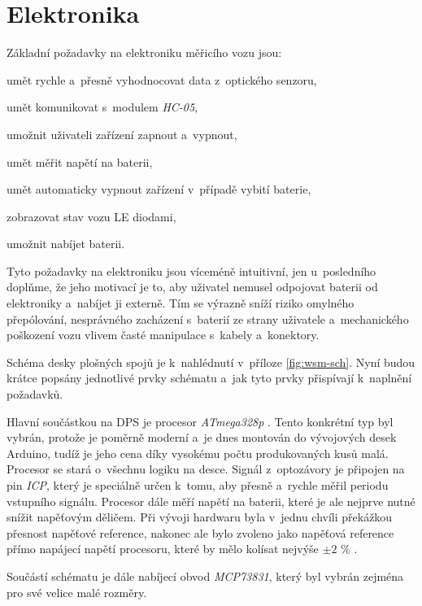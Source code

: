 \section{Elektronika}
\label{sec:wsm-ele}

Základní požadavky na elektroniku měřicího vozu jsou:

\begin{compactenum}
\item umět rychle a~přesně vyhodnocovat data z~optického senzoru,
\item umět komunikovat s~modulem \textit{HC-05},
\item umožnit uživateli zařízení zapnout a~vypnout,
\item umět měřit napětí na baterii,
\item umět automaticky vypnout zařízení v~případě vybití baterie,
\item zobrazovat stav vozu LE diodami,
\item umožnit nabíjet baterii.
\end{compactenum}

Tyto požadavky na elektroniku jsou víceméně intuitivní, jen u~posledního
doplňme, že jeho motivací je to, aby uživatel nemusel odpojovat baterii od
elektroniky a~nabíjet ji externě. Tím se výrazně sníží riziko omylného
přepólování, nesprávného zacházení s~baterií ze strany uživatele a~mechanického
poškození vozu vlivem časté manipulace s~kabely a~konektory.

Schéma desky plošných spojů je k~nahlédnutí v~příloze \ref{fig:wsm-sch}. Nyní
budou krátce popsány jednotlivé prvky schématu a~jak tyto prvky přispívají
k~naplnění požadavků.

Hlavní součástkou na DPS je procesor \textit{ATmega328p}
\cite{atmega328p:datasheet}.  Tento konkrétní typ byl vybrán, protože je
poměrně moderní a~je dnes montován do vývojových desek Arduino, tudíž je jeho
cena díky vysokému počtu produkovaných kusů malá. Procesor se stará o~všechnu
logiku na desce.  Signál z~optozávory je připojen na pin \textit{\gls{ICP}},
který je speciálně určen k~tomu, aby přesně a~rychle měřil periodu vstupního
signálu. Procesor dále měří napětí na baterii, které je ale nejprve nutné
snížit napěťovým děličem. Při vývoji hardwaru byla v~jednu chvíli překážkou
přesnost napěťové reference, nakonec ale bylo zvoleno jako napěťová reference
přímo napájecí napětí procesoru, které by mělo kolísat nejvýše $\pm 2$ \%
\cite{ldo:datasheet}.

Součástí schématu je dále nabíjecí obvod \textit{MCP73831}, který byl vybrán
zejména pro své velice malé rozměry.

